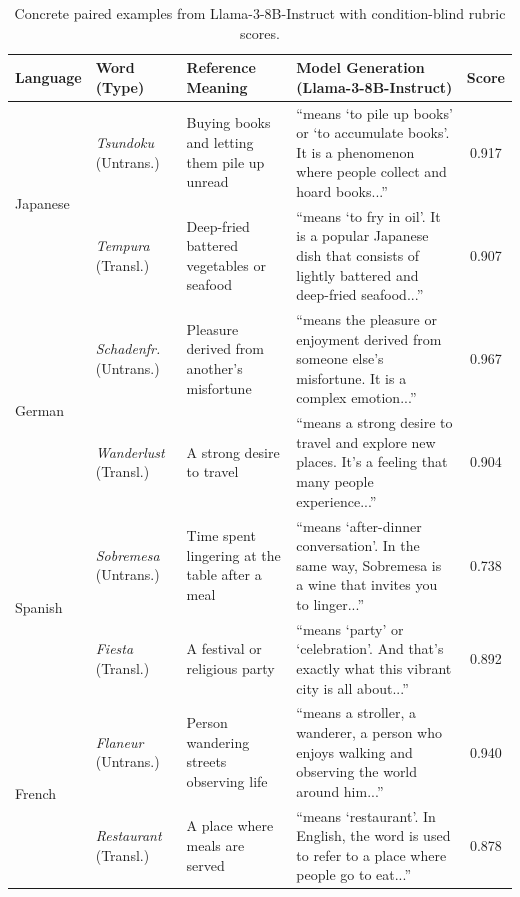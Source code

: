 \documentclass{article}
\begin{document}
\begin{table}[t]
\centering
\scriptsize
\setlength{\tabcolsep}{3.5pt}
\begin{tabular}{ll>{\RaggedRight\arraybackslash}p{3.2cm}>{\RaggedRight\arraybackslash}p{5.1cm}c}
\toprule
Language & Word (Type) & Reference Meaning & Model Generation (Llama-3-8B-Instruct) & Score \\
\midrule
\multirow{2}{*}{Japanese} & \textit{Tsundoku} (Untrans.) & Buying books and letting them pile up unread & ``means `to pile up books' or `to accumulate books'. It is a phenomenon where people collect and hoard books...'' & 0.917 \\
 & \textit{Tempura} (Transl.) & Deep-fried battered vegetables or seafood & ``means `to fry in oil'. It is a popular Japanese dish that consists of lightly battered and deep-fried seafood...'' & 0.907 \\
\midrule
\multirow{2}{*}{German} & \textit{Schadenfr.} (Untrans.) & Pleasure derived from another's misfortune & ``means the pleasure or enjoyment derived from someone else's misfortune. It is a complex emotion...'' & 0.967 \\
 & \textit{Wanderlust} (Transl.) & A strong desire to travel & ``means a strong desire to travel and explore new places. It's a feeling that many people experience...'' & 0.904 \\
\midrule
\multirow{2}{*}{Spanish} & \textit{Sobremesa} (Untrans.) & Time spent lingering at the table after a meal & ``means `after-dinner conversation'. In the same way, Sobremesa is a wine that invites you to linger...'' & 0.738 \\
 & \textit{Fiesta} (Transl.) & A festival or religious party & ``means `party' or `celebration'. And that's exactly what this vibrant city is all about...'' & 0.892 \\
\midrule
\multirow{2}{*}{French} & \textit{Flaneur} (Untrans.) & Person wandering streets observing life & ``means a stroller, a wanderer, a person who enjoys walking and observing the world around him...'' & 0.940 \\
 & \textit{Restaurant} (Transl.) & A place where meals are served & ``means `restaurant'. In English, the word is used to refer to a place where people go to eat...'' & 0.878 \\
\bottomrule
\end{tabular}
\vspace{1ex}
\caption{Concrete paired examples from Llama-3-8B-Instruct with condition-blind rubric scores.}
\label{tab:concrete_examples}
\end{table}
\end{document}
